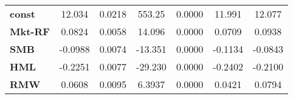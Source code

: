 \begin{center}
\begin{tabular}{lcccccc}
\midrule
\textbf{const}  &       12.034       &       0.0218       &      553.25     &      0.0000      &       11.991      &       12.077       \\
\textbf{Mkt-RF} &       0.0824       &       0.0058       &      14.096     &      0.0000      &       0.0709      &       0.0938       \\
\textbf{SMB}    &      -0.0988       &       0.0074       &     -13.351     &      0.0000      &      -0.1134      &      -0.0843       \\
\textbf{HML}    &      -0.2251       &       0.0077       &     -29.230     &      0.0000      &      -0.2402      &      -0.2100       \\
\textbf{RMW}    &       0.0608       &       0.0095       &      6.3937     &      0.0000      &       0.0421      &       0.0794       \\
\bottomrule
\end{tabular}
\end{center}
